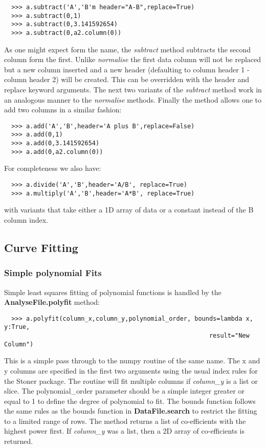 \documentclass[a4paper,11pt]{scrartcl}
\begin{document}
\begin{verbatim}
  >>> a.subtract('A','B'm header="A-B",replace=True)
  >>> a.subtract(0,1)
  >>> a.subtract(0,3.141592654)
  >>> a.subtract(0,a2.column(0))
\end{verbatim}

As one might expect form the name, the \textit{subtract} method subtracts the second column form the first. Unlike \textit{normalise} the first data column will not be replaced but a new column inserted and a new header (defaulting to column header 1 - column header 2) will be created. This can be overridden with the header and replace keyword arguments. The next two variants of the \textit{subtract} method work in an analogous manner to the \textit{normalise} methods. Finally the  method allows one to add two columns in a similar fashion:

\begin{verbatim}
  >>> a.add('A','B',header='A plus B',replace=False)
  >>> a.add(0,1)
  >>> a.add(0,3.141592654)
  >>> a.add(0,a2.column(0))
\end{verbatim}

For completeness we also have:

\begin{verbatim}
  >>> a.divide('A','B',header='A/B', replace=True)
  >>> a.multiply('A','B',header='A*B', replace=True)
\end{verbatim}

with variants that take either a 1D array of data or a constant instead of the B column index.

\subsection{Curve Fitting}

\subsubsection{Simple polynomial Fits}

Simple least squares fitting of polynomial functions is handled by the
\textbf{AnalyseFile.polyfit} method:

\begin{verbatim}
  >>> a.polyfit(column_x,column_y,polynomial_order, bounds=lambda x, y:True,
                                                        result="New Column")
\end{verbatim}

This is a simple pass through to the numpy routine of the same name. The x and y
columns are specified in the first two arguments using the usual index rules for
the Stoner package. The routine will fit multiple columns if \textit{column\_y}
is a list or slice. The polynomial\_order parameter should be a simple integer
greater or equal to 1 to define the degree of polynomial to fit. The bounds
function follows the same rules as the bounds function in
\textbf{DataFile.search} to restrict the fitting to a limited range of rows. The
method returns a list of co-efficients with the highest power first. If
\textit{column\_y} was a list, then a 2D array of co-efficients is returned.
\end{document}
